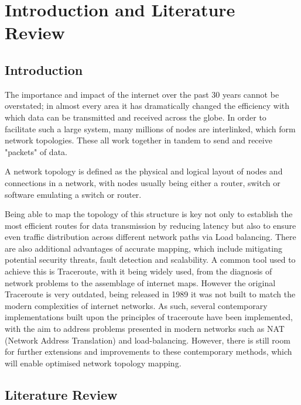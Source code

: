 \section{Introduction and Literature Review}




\subsection{Introduction}
The importance and impact of the internet over the past 30 years cannot be overstated; in almost every area it has dramatically changed the efficiency with which data can be transmitted and received across the globe. In order to facilitate such a large system, many millions of nodes are interlinked, which form network topologies. These all work together in tandem to send and receive "packets" of data. 

A network topology is defined as the physical and logical layout of nodes and connections in a network, with nodes usually being either a router, switch or software emulating a switch or router. 

Being able to map the topology of this structure is key not only to establish the most efficient routes for data transmission by reducing latency but also to ensure even traffic distribution across different network paths via Load balancing. There are also additional advantages of accurate mapping, which include mitigating potential security threats, fault detection and scalability. A common tool used to achieve this is Traceroute, with it being widely used, from the diagnosis of network
problems to the assemblage of internet maps. \cite{anomalies} However the original Traceroute is very outdated, being released in 1989 \cite{jacobson1989traceroute} it was not built to match the modern complexities of internet networks. As such, several contemporary implementations built upon the principles of traceroute have been implemented, with the aim to address problems presented in modern networks such as NAT (Network Address Translation) and load-balancing. However, there is still room for further extensions and improvements to these contemporary methods, which will enable optimised network topology mapping. 

\subsection{Literature Review}

